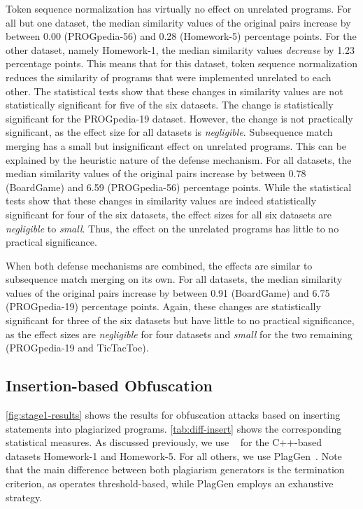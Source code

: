 Token sequence normalization has virtually no effect on unrelated programs.
For all but one dataset, the median similarity values of the original pairs increase by between 0.00 (PROGpedia-56) and 0.28 (Homework-5) percentage points.
For the other dataset, namely Homework-1, the median similarity values \textit{decrease} by 1.23 percentage points. This means that for this dataset, token sequence normalization reduces the similarity of programs that were implemented unrelated to each other.
The statistical tests show that these changes in similarity values are not statistically significant for five of the six datasets. The change is statistically significant for the PROGpedia-19 dataset. However, the change is not practically significant, as the effect size for all datasets is \textit{negligible}.
%
Subsequence match merging has a small but insignificant effect on unrelated programs. This can be explained by the heuristic nature of the defense mechanism.
For all datasets, the median similarity values of the original pairs increase by between 0.78 (BoardGame) and 6.59 (PROGpedia-56) percentage points.
While the statistical tests show that these changes in similarity values are indeed statistically significant for four of the six datasets, the effect sizes for all six datasets are \textit{negligible} to \textit{small}.
Thus, the effect on the unrelated programs has little to no practical significance. 

When both defense mechanisms are combined, the effects are similar to subsequence match merging on its own.
For all datasets, the median similarity values of the original pairs increase by between 0.91 (BoardGame) and 6.75 (PROGpedia-19) percentage points.
Again, these changes are statistically significant for three of the six datasets but have little to no practical significance, as the effect sizes are \textit{negligible} for four datasets and \textit{small} for the two remaining (PROGpedia-19 and TicTacToe).


\subsection{Insertion-based Obfuscation}\label{sec:eval-insert}
\autoref{fig:stage1-results} shows the results for obfuscation attacks based on inserting statements into plagiarized programs.
\autoref{tab:diff-insert} shows the corresponding statistical measures.
As discussed previously, we use \mossad~\cite{DevoreMcDonald2020} for the C++-based datasets Homework-1 and Homework-5. For all others, we use PlagGen~\cite{Broedel2023}. Note that the main difference between both plagiarism generators is the termination criterion, as \mossad operates threshold-based, while PlagGen employs an exhaustive strategy.

